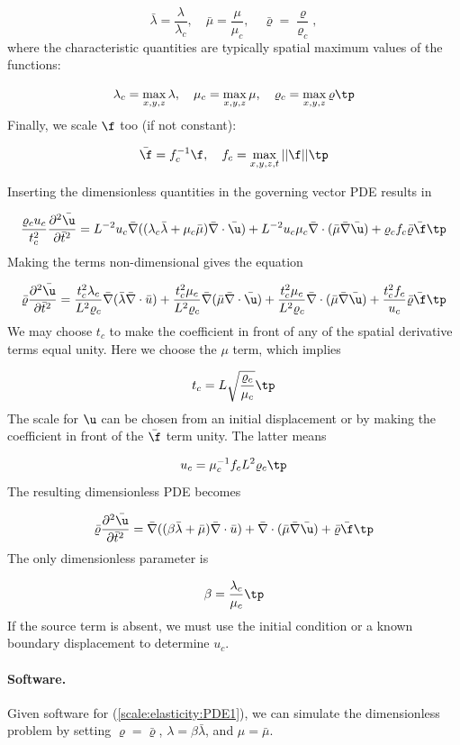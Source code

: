 \documentclass[graybox,envcountchap,sectrefs,final]{svmonodo}
\begin{document}
\[ \bar\lambda = \frac{\lambda}{\lambda_c},\quad
\bar\mu = \frac{\mu}{\mu_c},\quad
\bar\varrho = \frac{\varrho}{\varrho_c},\]
where the characteristic quantities are typically spatial maximum values of
the functions:

\[ \lambda_c = \max_{x,y,z}\lambda,\quad
\mu_c = \max_{x,y,z}\mu,\quad
\varrho_c = \max_{x,y,z}\varrho\tp\]
Finally, we scale $\f$ too (if not constant):

\[ \bar\f = f_c^{-1}\f,\quad f_c = \max_{x,y,z,t}||\f||\tp\]

Inserting the dimensionless quantities in the governing vector PDE results in

\[
\frac{\varrho_c u_c}{t_c^2}
\frac{\partial^2\bar \u}{\partial \bar t^2} =
L^{-2}u_c\bar \nabla ((\lambda_c\bar\lambda +
\mu_c\bar\mu)\bar \nabla\cdot\bar \u) +
L^{-2}u_c\mu_c\bar \nabla\cdot(\bar \mu\bar \nabla\bar \u) +
\varrho_cf_c\bar\varrho\bar\f\tp
\]
Making the terms non-dimensional gives the equation

\begin{equation}
\bar\varrho\frac{\partial^2\bar \u}{\partial \bar t^2} =
\frac{t_c^2\lambda_c}{L^2\varrho_c}
\bar \nabla (\bar\lambda\bar\nabla\cdot\bar u) +
\frac{t_c^2\mu_c}{L^2\varrho_c}
\bar\nabla(\bar\mu \bar\nabla\cdot\bar \u) +
\frac{t_c^2\mu_c}{L^2\varrho_c}\bar \nabla\cdot(\bar \mu\bar \nabla\bar \u) +
\frac{t_c^2f_c}{u_c}\bar\varrho\bar\f\tp
\end{equation}
We may choose $t_c$ to make the coefficient in front of any of the spatial
derivative terms equal unity. Here we choose the $\mu$ term, which implies

\[ t_c = L\sqrt{\frac{\varrho_c}{\mu_c}}\tp\]
The scale for $\u$ can be chosen from an initial displacement or by
making the coefficient in front of the $\bar\f$ term unity. The latter
means

\[ u_c = \mu_c^{-1}f_cL^2\varrho_c\tp\]
The resulting dimensionless PDE becomes

\begin{equation}
\bar\varrho\frac{\partial^2\bar \u}{\partial \bar t^2} =
\bar \nabla ((\beta\bar\lambda + \bar\mu)\bar\nabla\cdot\bar u) +
\bar \nabla\cdot(\bar \mu\bar \nabla\bar \u) +
\bar\varrho\bar\f\tp
\end{equation}
The only dimensionless parameter is

\[ \beta = \frac{\lambda_c}{\mu_c}\tp\]
If the source term is absent, we must use the initial condition or
a known boundary displacement to
determine $u_c$.

\paragraph{Software.}
Given software for (\ref{scale:elasticity:PDE1}),
we can simulate the dimensionless problem by setting $\varrho =\bar\varrho$,
$\lambda =\beta\bar\lambda$, and $\mu = \bar\mu$.
\end{document}
